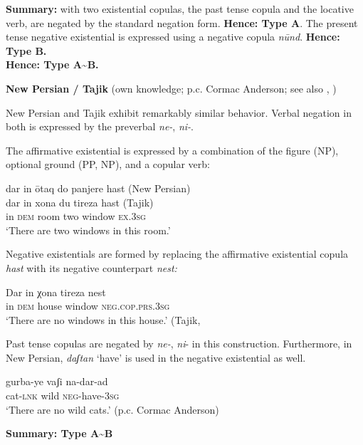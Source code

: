 ﻿\documentclass[output=paper]{langsci/langscibook}
\begin{document}
\begin{unindented}
\textbf{Summary:} with two existential copulas, the past tense copula and
the locative verb, are negated by the standard negation form.
\textbf{Hence: Type A}. The present tense negative existential is expressed
using a negative copula \textit{nūnd}. \textbf{Hence: Type B.}\\
\textbf{Hence: Type A{\textasciitilde}B.}

\textbf{New Persian / Tajik} (own knowledge; p.c. Cormac Anderson; see also
\citealt{Perry2005}, \citealt{WindfuhrPerry2009})

New Persian and Tajik exhibit remarkably similar behavior. Verbal negation in both is expressed by the preverbal \textit{ne-}, \textit{ni-}. 

The affirmative existential is expressed by a combination of the figure (NP), optional ground (PP, NP), and a copular verb:
%
\begin{exe}\ex
    \glll dar in ōtaq   do   panjere  hast    (New Persian) \\
dar in       xona  du   tireza     hast    (Tajik) \\
in    \textsc{dem}  room  two window \textsc{ex.3sg}\\
    \glt `There are two windows in this room.' \parencite[450]{WindfuhrPerry2009}
    \end{exe}

Negative existentials are formed by replacing the affirmative existential copula \textit{hast} with its negative counterpart \textit{nest:} 
%
\begin{exe}\ex
    \gll Dar  in       χona    tireza     nest \\
in     \textsc{dem}   house   window \textsc{neg.cop.prs.3sg} \\
    \glt `There are no windows in this house.' (Tajik, \citealt[202]{Perry2005}
    \end{exe}

Past tense copulas are negated by \textit{ne-}, \textit{ni}- in this construction. Furthermore, in New Persian, \textit{daʃtan} `have' is used in the negative existential as well.
%
\begin{exe}\ex
    \gll gurba-ye vaʃi  na-dar-ad \\
cat-\textsc{lnk}   wild \textsc{neg}-have-\textsc{3sg} \\
    \glt `There are no wild cats.' (p.c. Cormac Anderson)
    \end{exe}

\textbf{Summary: Type A{\textasciitilde}B}


\end{unindented}
\end{document}

